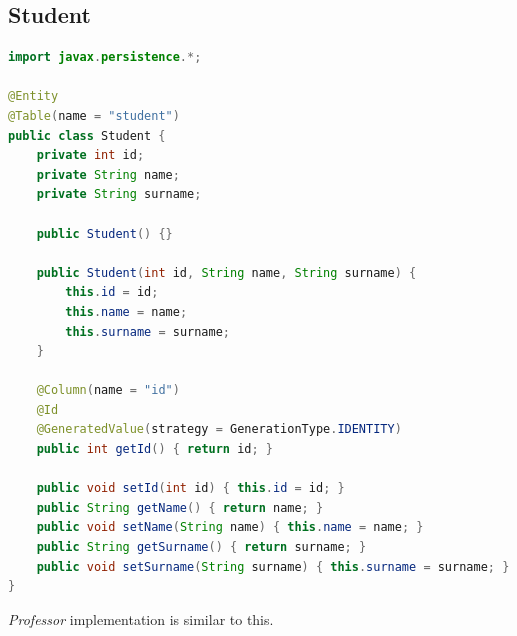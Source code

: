 \documentclass{report}
\begin{document}
\subsection*{Student}
\begin{lstlisting}[language=Java]
import javax.persistence.*;

@Entity
@Table(name = "student")
public class Student {
	private int id;
	private String name;
	private String surname;

	public Student() {}

	public Student(int id, String name, String surname) {
		this.id = id;
		this.name = name;
		this.surname = surname;
	}

	@Column(name = "id")
	@Id
	@GeneratedValue(strategy = GenerationType.IDENTITY)
	public int getId() { return id; }

	public void setId(int id) { this.id = id; }
	public String getName() { return name; }
	public void setName(String name) { this.name = name; }
	public String getSurname() { return surname; }
	public void setSurname(String surname) { this.surname = surname; }
}
\end{lstlisting}
\textit{Professor} implementation is similar to this.
\end{document}
